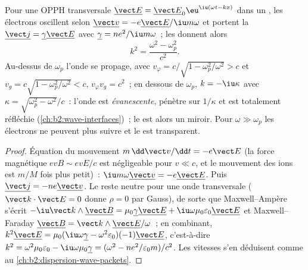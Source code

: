 \begin{theorem}\label{thm:b2:waves-in-media:plasmadispersion}
Pour une OPPH transversale $\underline{\vect E} = \underline{\vect E}_0\eu^{\iu(\omega t - kx)}$ dans
un , les électrons oscillent selon $\underline{\vect v} = -e\underline{\vect E}/\iu m\omega$
et portent la  $\underline{\vect j} = \underline\gamma\underline{\vect E}$ avec
$\underline\gamma = ne^2/\iu m\omega$~; les  donnent alors
\[
k^2 = \frac{\omega^2 - \omega_p^2}{c^2} .
\]
Au-dessus de $\omega_p$ l'onde se propage, avec $v_\varphi = c/\sqrt{1 - \omega_p^2/\omega^2}
> c$ et $v_g = c\sqrt{1 - \omega_p^2/\omega^2} < c$, $v_\varphi v_g = c^2$~; en dessous
de $\omega_p$, $k = -\iu\kappa$ avec $\kappa = \sqrt{\omega_p^2 - \omega^2}/c$~: l'onde est
\emph{évanescente}, pénètre sur $1/\kappa$ et est totalement réfléchie
(\cref{ch:b2:wave-interfaces})~; le  est alors un miroir. Pour $\omega
\gg \omega_p$ les électrons ne peuvent plus suivre et le  est transparent.
\end{theorem}

\begin{proof}
Équation du mouvement $m\,\dd\vect v/\dd t = -e\vect E$ (la force magnétique
$ev B \sim evE/c$ est négligeable pour $v \ll c$, et le mouvement des ions est
$m/M$ fois plus petit)~: $\iu m\omega\underline{\vect v} = -e\underline{\vect E}$. Puis
$\underline{\vect j} = -ne\underline{\vect v}$. Le  reste neutre pour une
onde transversale ($\vect k\cdot\vect E = 0$ donne $\rho = 0$ par Gauss), de sorte que
Maxwell--Ampère s'écrit $-\iu\vect k\wedge\underline{\vect B} = \mu_0\underline\gamma\underline{\vect E}
+ \iu\omega\mu_0\varepsilon_0\underline{\vect E}$ et Maxwell--Faraday $\underline{\vect B} = \vect k
\wedge\underline{\vect E}/\omega$~; en combinant, $k^2\underline{\vect E} = \mu_0(\iu\omega\underline\gamma -
\omega^2\varepsilon_0)(-1)\underline{\vect E}$, c'est-à-dire $k^2 = \omega^2\mu_0\varepsilon_0 - \iu\omega\mu_0
\underline\gamma = (\omega^2 - ne^2/\varepsilon_0m)/c^2$. Les vitesses s'en déduisent comme au
\cref{ch:b2:dispersion-wave-packets}.
\end{proof}

